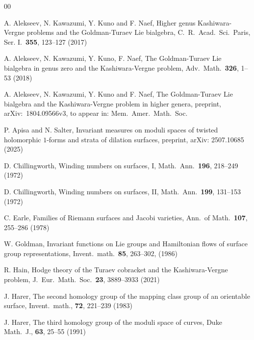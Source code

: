 \documentclass[a4paper,12pt, twoside]{amsart}
\theoremstyle{definition}
\theoremstyle{remark}
\numberwithin{equation}{section}
\begin{document}
\begin{thebibliography}{00}

A. Alekseev, N. Kawazumi, Y. Kuno and F. Naef,
Higher genus Kashiwara-Vergne problems and 
the Goldman-Turaev Lie bialgebra,
C.\ R.\ Acad.\ Sci.\ Paris, Ser. I.\ \textbf{355}, 123--127 (2017)

A. Alekseev, N. Kawazumi, Y. Kuno, F. Naef,
The Goldman-Turaev Lie bialgebra in genus zero and the Kashiwara-Vergne problem, Adv.\ Math.\ \textbf{326}, 1--53  (2018)


A. Alekseev, N. Kawazumi, Y. Kuno and F. Naef,
The Goldman-Turaev Lie bialgebra and 
the Kashiwara-Vergne problem in higher genera, 
preprint, arXiv:\ 1804.09566v3, 
to appear in: Mem.\ Amer.\ Math.\ Soc.

P. Apisa and N. Salter,
Invariant measures on moduli spaces of twisted holomorphic $1$-forms and strata of dilation surfaces,
preprint, arXiv: 2507.10685 (2025)  

D. Chillingworth,
Winding numbers on surfaces, I,
Math.\ Ann.\ \textbf{196}, 218--249 (1972)

D. Chillingworth,
Winding numbers on surfaces, II,
Math.\ Ann.\ \textbf{199}, 131--153 (1972)

C. Earle,
Families of Riemann surfaces and Jacobi varieties,
Ann.\ of Math.\ \textbf{107}, 255--286 (1978)


W. Goldman,
Invariant functions on Lie groups and Hamiltonian flows of surface group representations,
Invent.\ math.\ \textbf{85}, 263--302, (1986)

R. Hain, 
Hodge theory of the Turaev cobracket and the Kashiwara-Vergne problem, 
J.\  Eur.\ Math.\ Soc.\ \textbf{23}, 3889--3933 (2021)

J. Harer,
The second homology group of the mapping class group of an orientable surface,
Invent.\ math., \textbf{72}, 221--239 (1983)

J. Harer,
The third homology group of the moduli space of curves,
Duke Math.\ J., \textbf{63}, 25--55 (1991)


\end{thebibliography}
\end{document}
